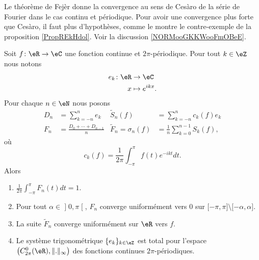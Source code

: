 Le théorème de Fejèr donne la convergence au sens de Cesàro de la série de Fourier dans le cas continu et périodique. Pour avoir une convergence plus forte que Cesàro, il faut plus d'hypothèses, comme le montre le contre-exemple de la proposition \ref{PropREkHdol}. Voir la discussion \ref{NORMooGKKWooFmOBeE}.
\begin{theorem}[Fejèr]      \label{ThoJFqczow}
    Soit \( f\colon \eR\to \eC\) une fonction continue et \( 2\pi\)-périodique. Pour tout \( k\in \eZ\) nous notons
    \begin{equation}
        \begin{aligned}
            e_k\colon \eR&\to \eC \\
            x&\mapsto  e^{ikx}.
        \end{aligned}
    \end{equation}
    Pour chaque \( n\in \eN\) nous posons
    \begin{subequations}
        \begin{align}
            D_n&=\sum_{k=-n}^ne_k& \tilde S_n(f)&=\sum_{k=-n}^nc_k(f)e_k\\
            F_n&=\frac{  D_0+\cdots + D_{n-1} }{ n }&  \tilde F_n=\sigma_n(f)&=\frac{1}{ n }\sum_{k=0}^{n-1}S_k(f),
        \end{align}
    \end{subequations}
    où
    \begin{equation}
        c_k(f)=\frac{1}{ 2\pi }\int_{-\pi}^{\pi}f(t) e^{-ikt}dt.
    \end{equation}
    Alors
    \begin{enumerate}
        \item
            $\frac{1}{ 2\pi }\int_{-\pi}^{\pi}F_n(t)dt=1$.
        \item
            Pour tout \( \alpha\in \mathopen] 0 , \pi \mathclose[\), \( F_n\) converge uniformément vers \( 0\) sur \( \mathopen[ -\pi , \pi \mathclose]\setminus\mathopen[ -\alpha , \alpha \mathclose]\).
        \item
            La suite \( \tilde F_n \) converge uniformément sur \( \eR\) vers \( f\).
        \item   \label{ItemUNQSPmyiv}
            Le système trigonométrique \( \{ e_k \}_{k\in\eZ}\) est total pour l'espace \( \big( C^0_{2\pi}(\eR),\| . \|_{\infty} \big)\) des fonctions continues \( 2\pi\)-périodiques.
    \end{enumerate}
\end{theorem}

